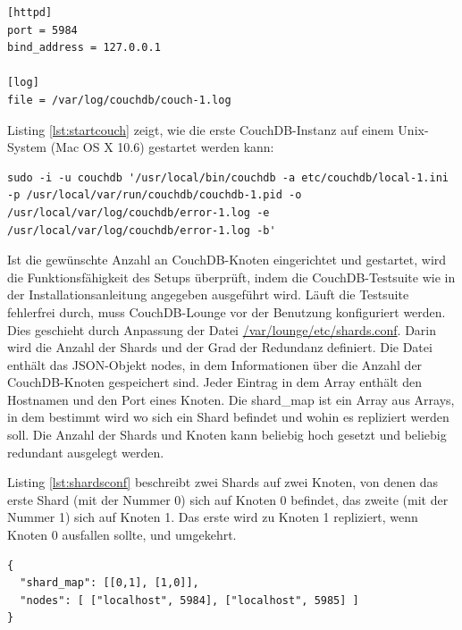 \medskip
\begin{lstlisting}[caption=Auszug aus der CouchDB Konfigurationsdatei, label=lst:local.ini]
[httpd] 
port = 5984
bind_address = 127.0.0.1

[log]
file = /var/log/couchdb/couch-1.log
\end{lstlisting}


Listing \ref{lst:startcouch} zeigt, wie die erste CouchDB-Instanz auf einem Unix-System (Mac OS X 10.6) gestartet werden kann:

\medskip
\begin{lstlisting}[caption=Starten einer CouchDB-Instanz, label=lst:startcouch]
sudo -i -u couchdb '/usr/local/bin/couchdb -a etc/couchdb/local-1.ini -p /usr/local/var/run/couchdb/couchdb-1.pid -o /usr/local/var/log/couchdb/error-1.log -e /usr/local/var/log/couchdb/error-1.log -b'
\end{lstlisting}

Ist die gewünschte Anzahl an CouchDB-Knoten eingerichtet und gestartet, wird die Funktionsfähigkeit des Setups überprüft, indem die CouchDB-Testsuite wie in der Installationsanleitung angegeben ausgeführt wird. Läuft die Testsuite fehlerfrei durch, muss CouchDB-Lounge vor der Benutzung konfiguriert werden. Dies geschieht durch Anpassung der Datei \url{/var/lounge/etc/shards.conf}. Darin wird die Anzahl der Shards und der Grad der Redundanz definiert. Die Datei enthält das JSON-Objekt {\selectfont nodes}, in dem Informationen über die Anzahl der CouchDB-Knoten gespeichert sind. Jeder Eintrag in dem Array enthält den Hostnamen und den Port eines Knoten. Die {\selectfont shard\_map} ist ein Array aus Arrays, in dem bestimmt wird wo sich ein Shard befindet und wohin es repliziert werden soll. Die Anzahl der Shards und Knoten kann beliebig hoch gesetzt und beliebig redundant ausgelegt werden. 

Listing \ref{lst:shardsconf} beschreibt zwei Shards auf zwei Knoten, von denen das erste Shard (mit der Nummer 0) sich auf Knoten 0 befindet, das zweite (mit der Nummer 1) sich auf Knoten 1. Das erste wird zu Knoten 1 repliziert, wenn Knoten 0 ausfallen sollte, und umgekehrt.

\lstset{language=bash}
\medskip
\begin{lstlisting}[caption=shards.conf mit zwei Knoten und einfacher Redundanz, label=lst:shardsconf]
{
  "shard_map": [[0,1], [1,0]],
  "nodes": [ ["localhost", 5984], ["localhost", 5985] ]
}
\end{lstlisting}

